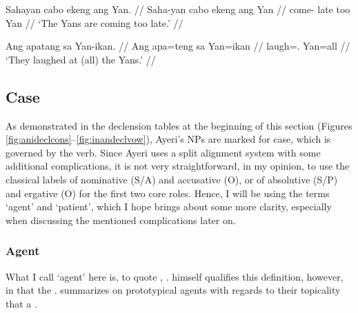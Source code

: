 \pex
\a\begingl
	\gla Sahayan cabo ekeng ang Yan. //
	\glb Saha-yan cabo ekeng ang Yan //
	\glc come-\TplM{} late too \Aarg{} Yan //
	\glft `The Yans are coming too late.' //
\endgl

\a\begingl
	\gla Ang apatang sa Yan-ikan. //
	\glb Ang apa=teng sa Yan=ikan //
	\glc \AgtT{} laugh=\TplF{}.\Aarg{} \Parg{} Yan=all //
	\glft `They laughed at (all) the Yans.' //
\endgl

\xe


\subsection{Case}
\label{subsec:case}

As demonstrated in the declension tables at the beginning of this section 
(Figures \ref{fig:anideclcons}–\ref{fig:inandeclvow}), Ayeri's NPs are marked 
for case, which is governed by the verb. Since Ayeri uses a split alignment 
system with some additional complications, it is not very straightforward, in 
my opinion, to use the classical labels of nominative (S/A) and accusative (O), 
or of absolutive (S/P) and ergative (O) for the first two core roles. Hence, I 
will be using the terms `agent' and `patient', which I hope brings about some 
more clarity, especially when discussing the mentioned complications later on.


\subsubsection{Agent}

What I call `agent' here is, to quote \citet{fillmore1968}, 
. \citeauthor{fillmore1968} 
himself qualifies this definition, however, in that the . 
\citet{payne1997} summarizes on prototypical agents with regards to 
their topicality that a .

